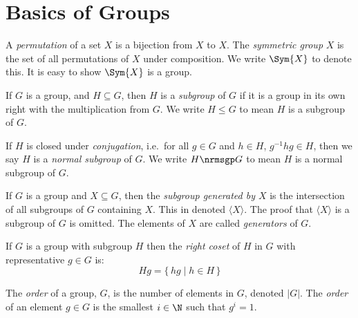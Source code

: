 \section{Basics of Groups}

\begin{definition}
    \raggedright
    A \emph{permutation} of a set \(X\) is a bijection from \(X\) to \(X\).
    The \emph{symmetric group} \(X\) is the set of all permutations of \(X\) under composition.
    We write \(\Sym{X}\) to denote this.
    It is easy to show \(\Sym{X}\) is a group.
\end{definition}

\begin{definition}
    \raggedright
    If \(G\) is a group, and \(H \subseteq G\), then \(H\) is a \emph{subgroup} of \(G\) if it is a group in its own right with
    the multiplication from \(G\).
    We write \(H \leqslant G\) to mean \(H\) is a subgroup of \(G\).

    If \(H\) is closed under \emph{conjugation}, i.e.\ for all \(g \in G\) and \(h \in H\), \(g^{-1}hg \in H\), then we
    say \(H\) is a \emph{normal subgroup} of \(G\).
    We write \(H \nrmsgp G\) to mean \(H\) is a normal subgroup of \(G\).
\end{definition}

\begin{definition}
    \raggedright
    If \(G\) is a group and \(X \subseteq G\), then the \emph{subgroup generated by \(X\)} is the intersection of all
    subgroups of \(G\) containing \(X\).
    This in denoted \(\langle X \rangle\).
    The proof that \(\langle X \rangle\) is a subgroup of \(G\) is omitted.
    The elements of \(X\) are called \emph{generators} of \(G\).
\end{definition}

\begin{definition}
    \raggedright
    If \(G\) is a group with subgroup \(H\) then the \emph{right coset} of \(H\) in \(G\) with representative \(g \in
    G\) is:
    \[Hg = \{\,hg \mid h \in H\,\}\]
\end{definition}

\begin{definition}
    \raggedright
    The \emph{order} of a group, \(G\), is the number of elements in \(G\), denoted \(|G|\).
    The \emph{order} of an element \(g \in G\) is the smallest \(i \in \N\) such that \(g^i = 1\).
\end{definition}


